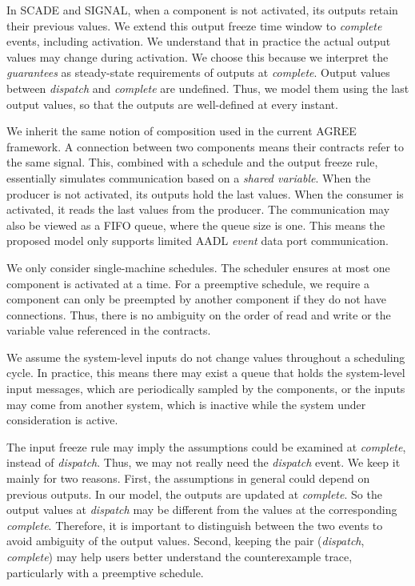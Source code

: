 In SCADE and SIGNAL, when a component is not activated, its outputs retain their previous values. We extend this output freeze time window to \emph{complete} events, including activation. We understand that in practice the actual output values may change during activation. We choose this because we interpret the \emph{guarantees} as steady-state requirements of outputs at \emph{complete}. Output values between \textit{dispatch} and \textit{complete} are undefined. Thus, we model them using the last output values, so that the outputs are well-defined at every instant.

We inherit the same notion of composition used in the current AGREE framework. A connection between two components means their contracts refer to the same signal. 
This, combined with a schedule and the output freeze rule, essentially simulates communication based on a \emph{shared variable}. When the producer is not activated, its outputs hold the last values. When the consumer is activated, it reads the last values from the producer. The communication may also be viewed as a FIFO queue, where the queue size is one. %
This means the proposed model only supports limited AADL \textit{event} data port communication.

We only consider single-machine schedules. The scheduler ensures at most one component is activated at a time. For a preemptive schedule, we require a component can only be preempted by another component if they do not have connections. Thus, there is no ambiguity on the order of read and write or the variable value referenced in the contracts.

We assume the system-level inputs do not change values throughout a scheduling cycle. In practice, this means there may exist a queue that holds the system-level input messages, which are periodically sampled by the components, or the inputs may come from another system, which is inactive while the system under consideration is active.

The input freeze rule may imply the assumptions could be examined at \emph{complete}, instead of \emph{dispatch}. Thus, we may not really need the \emph{dispatch} event. We keep it mainly for two reasons. First, the assumptions in general could depend on previous outputs. In our model, the outputs are updated at \emph{complete}. So the output values at \emph{dispatch} may be different from the values at the corresponding \emph{complete}. Therefore, it is important to distinguish between the two events to avoid ambiguity of the output values. Second, keeping the pair (\emph{dispatch}, \emph{complete}) may help users better understand the counterexample trace, particularly with a preemptive schedule.

